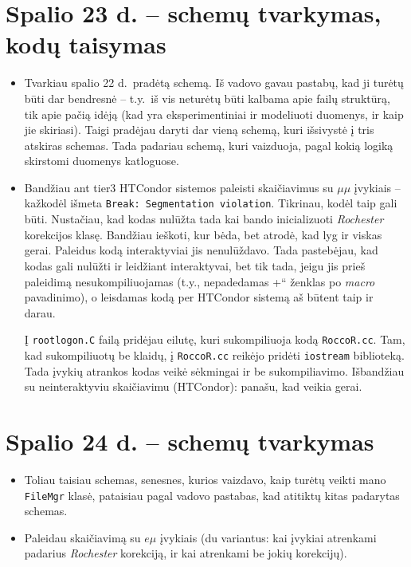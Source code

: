 \documentclass[a4paper, 12pt]{article}
\newcommand{\ltq}[1]{{\quotedblbase{}#1\textquotedblleft{}}}
\newcommand{\ttt}[1]{\texttt{#1}}
\begin{document}
\section{Spalio 23 d. -- schemų tvarkymas, kodų taisymas}
\begin{itemize}
	\item Tvarkiau spalio 22 d.\ pradėtą schemą. Iš vadovo gavau pastabų, kad ji
	turėtų būti dar bendresnė -- t.y.\ iš vis neturėtų būti kalbama apie failų
	struktūrą, tik apie pačią idėją (kad yra eksperimentiniai ir modeliuoti duomenys,
	ir kaip jie skiriasi). Taigi pradėjau daryti dar vieną schemą, kuri išsivystė į tris
	atskiras schemas. Tada padariau schemą, kuri vaizduoja, pagal kokią logiką skirstomi
	duomenys katloguose.
	
	\item Bandžiau ant tier3 HTCondor sistemos paleisti skaičiavimus su $\mu\mu$ 
	įvykiais -- kažkodėl išmeta \ttt{Break: Segmentation violation}. Tikrinau, kodėl
	taip gali būti. Nustačiau, kad kodas nulūžta tada kai bando inicializuoti
	\textit{Rochester} korekcijos klasę. Bandžiau ieškoti, kur bėda, bet atrodė, kad
	lyg ir viskas gerai. Paleidus kodą interaktyviai jis nenulūždavo. Tada pastebėjau,
	kad kodas gali nulūžti ir leidžiant interaktyvai, bet tik tada, jeigu jis prieš
	paleidimą nesukompiliuojamas (t.y., nepadedamas \ltq{+} ženklas po \textit{macro}
	pavadinimo), o leisdamas kodą per HTCondor sistemą aš būtent taip ir darau.
	
	Į \ttt{rootlogon.C} failą pridėjau eilutę, kuri sukompiliuoja kodą \ttt{RoccoR.cc}.
	Tam, kad sukompiliuotų be klaidų, į \ttt{RoccoR.cc} reikėjo pridėti \ttt{iostream}
	biblioteką. Tada įvykių atrankos kodas veikė sėkmingai ir be sukompiliavimo. Išbandžiau
	su neinteraktyviu skaičiavimu (HTCondor): panašu, kad veikia gerai.
\end{itemize}

\section{Spalio 24 d. -- schemų tvarkymas}
\begin{itemize}
	\item Toliau taisiau schemas, senesnes, kurios vaizdavo, kaip turėtų veikti mano
	\ttt{FileMgr} klasė, pataisiau pagal vadovo pastabas, kad atitiktų kitas padarytas schemas.
	\item Paleidau skaičiavimą su $e\mu$ įvykiais (du variantus: kai įvykiai atrenkami padarius
	\textit{Rochester} korekciją, ir kai atrenkami be jokių korekcijų).
\end{itemize}



\end{document}
